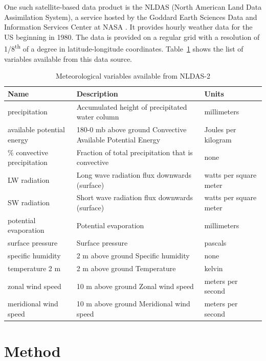 \documentclass{article} %
\begin{document}
One such satellite-based data product is the NLDAS (North American Land Data Assimilation System), a service hosted by the Goddard Earth Sciences Data and Information Services Center at NASA \cite{LDAS}. It provides hourly weather data for the US beginning in 1980. The data is provided on a regular grid with a resolution of 1/8\textsuperscript{th} of a degree in latitude-longitude coordinates. Table~\ref{fig:NLDAS_vars} shows the list of variables available from this data source. 

\begin{table}[htbp]
  \centering
    \begin{tabular}{l l l}
    \toprule
    \textbf{Name} & \textbf{Description} & \textbf{Units} \\
    \midrule
    precipitation & Accumulated height of precipitated water column & millimeters \\
    available potential energy & 180-0 mb above ground Convective Available Potential Energy & Joules per kilogram \\
    \% convective precipitation & Fraction of total precipitation that is convective & none \\
    LW radiation & Long wave radiation flux downwards (surface) & watts per square meter \\
    SW radiation & Short wave radiation flux downwards (surface) & watts per square meter \\
    potential evaporation & Potential evaporation & millimeters \\
    surface pressure & Surface pressure & pascals \\
    specific humidity & 2 m above ground Specific humidity & none \\
    temperature 2 m & 2 m above ground Temperature & kelvin \\
    zonal wind speed & 10 m above ground Zonal wind speed & meters per second \\
    meridional wind speed & 10 m above ground Meridional wind speed & meters per second \\
    \bottomrule
    \end{tabular}%
    \caption{Meteorological variables available from NLDAS-2}
  \label{fig:NLDAS_vars}%
\end{table}%

\section{Method}
\label{sec:method}
\end{document}
